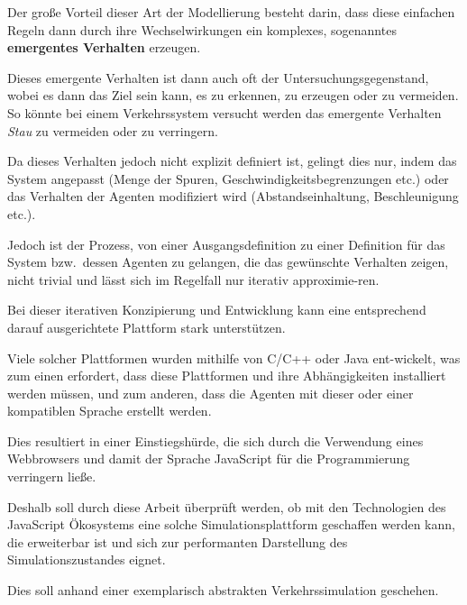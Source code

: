 Der große Vorteil dieser Art der Modellierung besteht darin, dass diese einfachen Regeln dann durch ihre Wechselwirkungen ein komplexes, sogenanntes \textbf{emergentes Verhalten} erzeugen.

Dieses emergente Verhalten ist dann auch oft der Untersuchungsgegenstand, wobei es dann das Ziel sein kann, es zu erkennen, zu erzeugen oder zu vermeiden.\autocite{chen2007}
So könnte bei einem Verkehrssystem versucht werden das emergente Verhalten \textit{Stau} zu vermeiden oder zu verringern.

Da dieses Verhalten jedoch nicht explizit definiert ist, gelingt dies nur, indem das System angepasst (Menge der Spuren, Geschwindigkeitsbegrenzungen etc.) oder das Verhalten der Agenten modifiziert wird (Abstandseinhaltung, Beschleunigung etc.).

Jedoch ist der Prozess, von einer Ausgangsdefinition zu einer Definition für das System bzw.\ dessen Agenten zu gelangen, die das gewünschte Verhalten zeigen, nicht trivial und lässt sich im Regelfall nur iterativ approximie-\linebreak ren.\autocite{nikolic2011}

Bei dieser iterativen Konzipierung und Entwicklung kann eine entsprechend darauf ausgerichtete Plattform stark unterstützen.

Viele solcher Plattformen wurden mithilfe von C/C++ oder Java ent-\linebreak wickelt\autocite{abar2017}, was zum einen erfordert, dass diese Plattformen und ihre Abhängigkeiten installiert werden müssen, und zum anderen, dass die Agenten mit dieser oder einer kompatiblen Sprache erstellt werden.

Dies resultiert in einer Einstiegshürde, die sich durch die Verwendung eines Webbrowsers und damit der Sprache JavaScript für die Programmierung verringern ließe.

Deshalb soll durch diese Arbeit überprüft werden, ob mit den Technologien des JavaScript Ökosystems eine solche Simulationsplattform geschaffen werden kann, die erweiterbar ist und sich zur performanten Darstellung des Simulationszustandes eignet.

Dies soll anhand einer exemplarisch abstrakten Verkehrssimulation geschehen.


